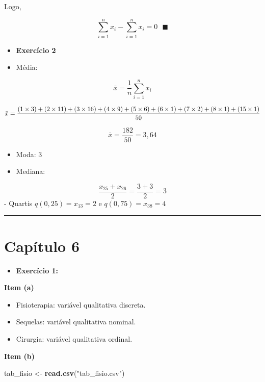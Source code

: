 \documentclass[
]{book}
\newenvironment{Shaded}{\begin{snugshade}}{\end{snugshade}}
\newcommand{\FunctionTok}[1]{\textcolor[rgb]{0.13,0.29,0.53}{\textbf{#1}}}
\newcommand{\NormalTok}[1]{#1}
\newcommand{\OtherTok}[1]{\textcolor[rgb]{0.56,0.35,0.01}{#1}}
\newcommand{\StringTok}[1]{\textcolor[rgb]{0.31,0.60,0.02}{#1}}
\providecommand{\tightlist}{%
  \setlength{\itemsep}{0pt}\setlength{\parskip}{0pt}}
\begin{document}
Logo,

\[
\sum_{i=1}^n x_i - \sum_{i=1}^n x_i = 0 \text{  } \blacksquare
\]

\begin{itemize}
\item
  \textbf{Exercício 2}
\item
  Média:
\end{itemize}

\[
\bar{x} = \frac{1}{n}\sum_{i=1}^n x_i 
\]

\[
\bar{x} = \frac{(1 \times 3) + (2 \times 11) + (3 \times 16) + (4 \times 9) + (5 \times 6) + (6 \times 1) + (7 \times 2) + (8 \times 1) + (15 \times 1)}{50} \\
\]

\[
\bar{x} = \frac{182}{50}  = 3,64
\]

\begin{itemize}
\item
  Moda: 3
\item
  Mediana:
\end{itemize}

\[
\frac{x_{25} + x_{26}}{2} =\frac{3 + 3}{2} = 3 
\]
- Quartis
\(q(0,25) = x_{13} = 2\) e \(q(0,75) = x_{38} = 4\)

\begin{center}\rule{0.5\linewidth}{0.5pt}\end{center}

\section{Capítulo 6}\label{capuxedtulo-6}

\begin{itemize}
\tightlist
\item
  \textbf{Exercício 1:}
\end{itemize}

\textbf{Item (a)}

\begin{itemize}
\tightlist
\item
  Fisioterapia: variável qualitativa discreta.
\item
  Sequelas: variável qualitativa nominal.
\item
  Cirurgia: variável qualitativa ordinal.
\end{itemize}

\textbf{Item (b)}

\begin{Shaded}
\begin{Highlighting}[]
\NormalTok{tab\_fisio }\OtherTok{\textless{}{-}} \FunctionTok{read.csv}\NormalTok{(}\StringTok{"tab\_fisio.csv"}\NormalTok{)}
\end{Highlighting}
\end{Shaded}
\end{document}
